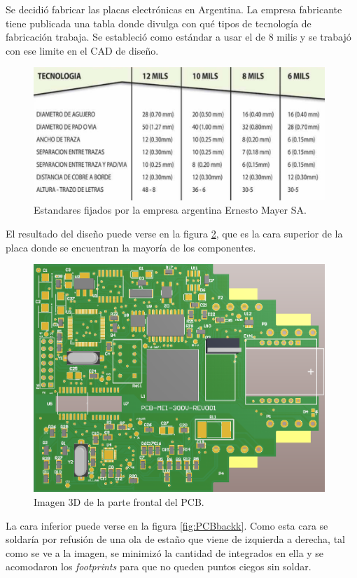 Se decidió fabricar las placas electrónicas en Argentina. La empresa fabricante tiene publicada una tabla donde divulga con qué tipos de tecnología de fabricación trabaja. Se estableció como estándar a usar el de 8 milis y se trabajó con ese limite en el CAD de diseño.

\begin{figure}[htb]
	\centering
	\includegraphics[width=110mm,keepaspectratio]{Figures/estandaresmayer.png}
	\caption{Estandares fijados por la empresa argentina Ernesto Mayer SA.}
	\label{fig:mayerstandar}
\end{figure}

El resultado del diseño puede verse en la figura \ref{fig:PCBfrontt}, que es la cara superior de la placa donde se encuentran la mayoría de los componentes. 

\begin{figure}[h]
	\centering
	\includegraphics[width=110mm,keepaspectratio]{Figures/PCBfront.png}
	\caption{Imagen 3D de la parte frontal del PCB.}
	\label{fig:PCBfrontt}
\end{figure}

La cara inferior puede verse en la figura \ref{fig:PCBbackk}. Como esta cara se soldaría por refusión de una ola de estaño que viene de izquierda a derecha, tal como se ve a la imagen, se minimizó la cantidad de integrados en ella y se acomodaron los \textit{footprints} para que no queden puntos ciegos sin soldar.

